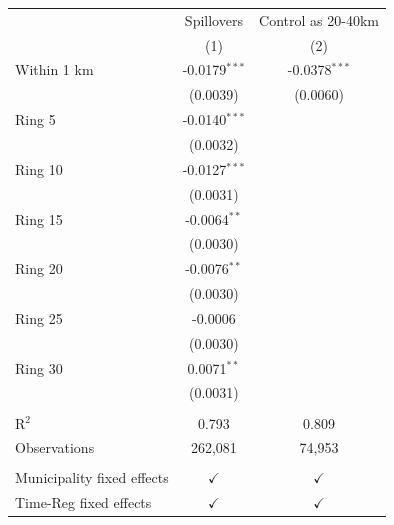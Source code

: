 \begingroup
\centering
\begin{tabular}{lcc}
   \toprule
                                 & Spillovers      & Control as 20-40km \\   
                                 & (1)             & (2)\\  
   \midrule 
   Within 1 km                   & -0.0179$^{***}$ & -0.0378$^{***}$\\   
                                 & (0.0039)        & (0.0060)\\   
   Ring 5                        & -0.0140$^{***}$ &   \\   
                                 & (0.0032)        &   \\   
   Ring 10                       & -0.0127$^{***}$ &   \\   
                                 & (0.0031)        &   \\   
   Ring 15                       & -0.0064$^{**}$  &   \\   
                                 & (0.0030)        &   \\   
   Ring 20                       & -0.0076$^{**}$  &   \\   
                                 & (0.0030)        &   \\   
   Ring 25                       & -0.0006         &   \\   
                                 & (0.0030)        &   \\   
   Ring 30                       & 0.0071$^{**}$   &   \\   
                                 & (0.0031)        &   \\   
    \\
   R$^2$                         & 0.793           & 0.809\\  
   Observations                  & 262,081         & 74,953\\  
    \\
   Municipality fixed effects & $\checkmark$    & $\checkmark$\\   
   Time-Reg fixed effects     & $\checkmark$    & $\checkmark$\\   
   \bottomrule
\end{tabular}
\par\endgroup
